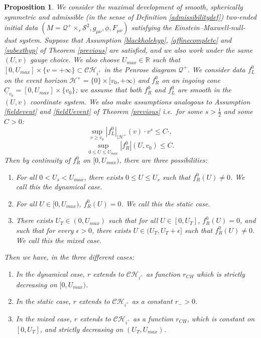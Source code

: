 \documentclass[10pt,a4paper]{article}
\theoremstyle{plain}
\newtheorem{prop}[thm]{Proposition}
\theoremstyle{remark}
\theoremstyle{definition}
\newcommand{\RR}{\mathbb{R}}
\theoremstyle{plain}
\theoremstyle{remark}
\theoremstyle{definition}
\newcommand{\CH}{\mathcal{CH}_{i^+}}
\numberwithin{equation}{section}
\begin{document}
\begin{prop} \label{propappendix}  	We consider the maximal development of smooth, spherically symmetric and admissible (in the sense of Definition \ref{admissibilitydef}) two-ended initial data  $(M=\mathcal{Q}^+ \times_r \mathcal{S}^2,g_{\mu \nu}, \phi,F_{\mu \nu})$ satisfying the Einstein--Maxwell-null-dust system. Suppose that Assumption \ref{blackholehyp}, \ref{affinecomplete} and \ref{subexthyp} of Theorem \ref{previous} are satisfied, and we also work under the same $(U,v)$ gauge choice. We also choose $U_{max}  \in \RR$ such that \color{black}$ [0,U_{max}]\times \{v=+\infty\} \subset \CH$  in the Penrose diagram $\mathcal{Q}^+$. We consider data  $f_L^0$ on the event horizon $\mathcal{H}^+= \{0\} \times  [v_0,+\infty)$  and $f_R^0$ on an ingoing cone $\underline{C}_{v_0}= [0,U_{max}]\times \{v_0\}$; we assume that both $f_R^0$ and $f_L^0$ are smooth in the $(U,v)$ coordinate system. We also make assumptions analogous to Assumption \ref{fieldevent} and \ref{fieldUevent} of Theorem \ref{previous} i.e.\ for some $s>\frac{1}{2}$ and some $C>0$:	$$\sup_{v \geq v_0 }|f_L^0|_{|\mathcal{H}^+}(v) \cdot v^{s}  \leq  C \cdot ,$$	$$ \sup_{0 \leq U \leq U_{max}}|f_R^0| (U, v_0) \leq C. $$   \color{black} Then by continuity of $f^0_R$ on $[0,U_{max})$,     there are three possibilities: \begin{enumerate}[a]
		\item \label{dynamicaldust}  For all $0<U_s<U_{max}$, there exists $0 \leq U \leq U_s$ such that $f^0_R(U) \neq 0$. \color{black} We call this the dynamical case.
		\item \label{staticdust} For all $U\in [0,U_{max})$, $f^0_R(U) = 0$. We call this the static case.
		\item \label{mixeddust} There exists $U_T \in (0,U_{max})$ such that for all $U\in [0,U_{T}]$, $f^0_R(U) = 0$, and such that for every $\epsilon>0$, there exists $U\in (U_{T},U_{T}+\epsilon]$ such that $f^0_R(U) \neq 0$\color{black}. We call this the mixed case.
	\end{enumerate}
	Then we have, in the three different cases: \begin{enumerate}[a]
		\item In the dynamical case, $r$ extends to $\CH$ as function $r_{CH}$  which is strictly decreasing on $[0,U_{max})$\color{black}.
		\item In the static case, $r$ extends to $\CH$ as a constant $r_{-}>0$.
		\item In the mixed case, $r$ extends to $\CH$ as a function $r_{CH}$, which is constant on $[0,U_T]$, and strictly decreasing on $(U_T,U_{max} )$.

\end{enumerate}
\end{prop}
\end{document}
